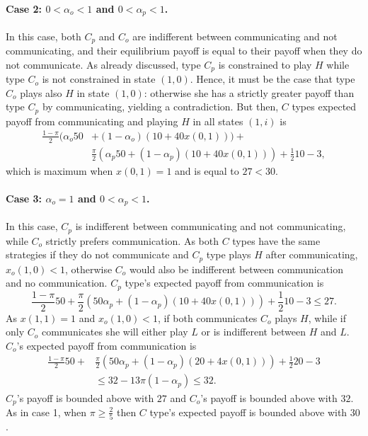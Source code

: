 \documentclass[12pt]{article}
\theoremstyle{break}
\begin{document}
    \paragraph{Case 2: $0 < \alpha_o < 1$ and $0 < \alpha_p < 1$.} In this case, both $C_p$ and $C_o$ are indifferent between communicating and not communicating, and their equilibrium payoff is equal to their payoff when they do not communicate. As already discussed, type $C_p$ is constrained to play $H$  while type $C_o$ is not constrained in state $(1,0)$. Hence, it must be the case that type $C_o$ plays also $H$ in state $(1,0)$: otherwise she has a strictly greater payoff than type $C_p$ by communicating, yielding a contradiction. But then, $C$ types expected payoff from communicating and playing $H$ in all states $(1,i)$ is
    \begin{align*}
    \frac{1-\pi}{2} (\alpha_o 50 & +(1-\alpha_o) (10+40x(0,1)))+ \\
    & \frac{\pi}{2} (\alpha_p 50+(1-\alpha_p) (10+40x(0,1)))+\frac{1}{2} 10 -3,
    \end{align*}
	which is maximum when $x(0,1)=1$ and is equal to $27<30$.
	
	\paragraph{Case 3: $\alpha_o = 1$ and $0 < \alpha_p < 1$.} In this case, $C_p$ is indifferent between communicating and not communicating, while $C_o$ strictly prefers communication. As both $C$ types have the same strategies if they do not communicate and $C_p$ type plays $H$ after communicating, $x_o(1,0)<1$, otherwise $C_o$ would also be indifferent between communication and no communication. $C_p$ type's expected payoff from communication is
	$$
	\frac{1-\pi}{2} 50 + \frac{\pi}{2}(50\alpha_p + (1-\alpha_p) (10+40x(0,1)))+\frac{1}{2}10-3\leq 27.
	$$
    As $x(1,1)=1$ and $x_o(1,0)<1$, if both communicates $C_o$ plays $H$, while if only $C_o$ communicates she will either play $L$ or is indifferent between $H$ and $L$. $C_o$'s expected payoff from communication is
    \begin{align*}
	\frac{1-\pi}{2} 50 + & \frac{\pi}{2}(50\alpha_p + (1-\alpha_p) (20+4x(0,1)))+\frac{1}{2}20-3 \\ 
	& \leq 32 - 13 \pi (1-\alpha_p) \leq 32.
	\end{align*}
    $C_p$'s payoff is bounded above with $27$ and $C_o$'s payoff is bounded above with $32$. As in case 1, when $\pi\geq \frac{2}{5}$ then $C$ type's expected payoff is bounded above with $30$.
    
\end{document}
